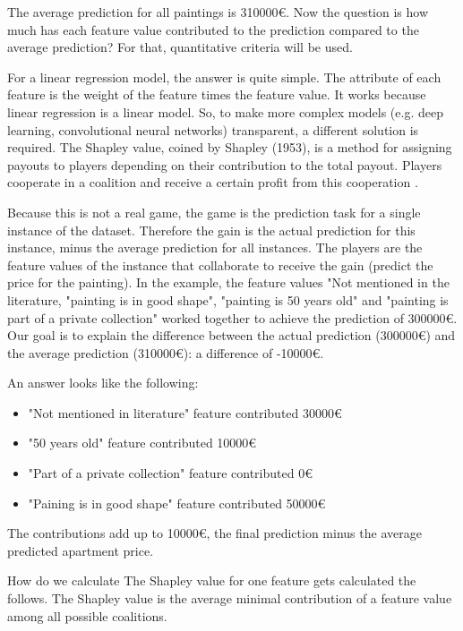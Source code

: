 The average prediction for all paintings is 310000€. Now the question is how much has each feature value contributed to the prediction compared to the average prediction? For that, quantitative criteria will be used.

For a linear regression model, the answer is quite simple. The attribute of each feature is the weight of the feature times the feature value. It works because linear regression is a linear model. So, to make more complex models (e.g. deep learning, convolutional neural networks) transparent, a different solution is required. The Shapley value, coined by Shapley (1953), is a method for assigning payouts to players depending on their contribution to the total payout. Players cooperate in a coalition and receive a certain profit from this cooperation \cite{aas2019explaining} \cite{Lundberg} \cite{ScottM}.

Because this is not a real game, the game is the prediction task for a single instance of the dataset. Therefore the gain is the actual prediction for this instance, minus the average prediction for all instances. The players are the feature values of the instance that collaborate to receive the gain (predict the price for the painting). In the example, the feature values "Not mentioned in the literature, "painting is in good shape", "painting is 50 years old" and "painting is part of a private collection" worked together to achieve the prediction of 300000€. Our goal is to explain the difference between the actual prediction (300000€) and the average prediction (310000€): a difference of -10000€.

An answer looks like the following:

\begin{itemize}
	\item "Not mentioned in literature" feature contributed  30000€
	\item "50 years old" feature contributed 10000€
	\item "Part of a private collection" feature contributed 0€
	\item "Paining is in good shape" feature contributed 50000€
\end{itemize}

The contributions add up to 10000€, the final prediction minus the average predicted apartment price.

How do we calculate The Shapley value for one feature gets calculated the follows. The Shapley value is the average minimal contribution of a feature value among all possible coalitions.\\

